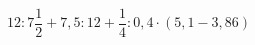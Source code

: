 \begin{ex}[type=calculate]
	\begin{condition}
		\( 12:7\dfrac{1}{2}+7,5:12+\dfrac{1}{4}:0,4\cdot(5,1-3,86) \)
	\end{condition}
	\answer{}
\end{ex}
